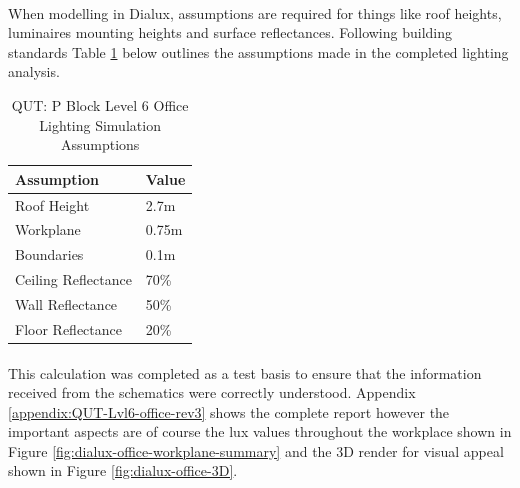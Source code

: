 \paragraph{}
When modelling in Dialux, assumptions are required for things like roof heights, luminaires mounting heights and surface reflectances. Following building standards Table \ref{table:QUT-lvl6-office-assumptions} below outlines the assumptions made in the completed lighting analysis. 

\begin{table}[htb]
	\centering
	\renewcommand{\arraystretch}{2}
	\begin{tabular}{|l|l|}
		\hline
		\textbf{Assumption} & \textbf{Value} \\ \hline
		Roof Height         & 2.7m           \\ \hline
		Workplane           & 0.75m          \\ \hline
		Boundaries          & 0.1m           \\ \hline
		Ceiling Reflectance & 70\%           \\ \hline
		Wall Reflectance    & 50\%           \\ \hline
		Floor Reflectance   & 20\%           \\ \hline
	\end{tabular}
	\caption{QUT: P Block Level 6 Office Lighting Simulation Assumptions}
	\label{table:QUT-lvl6-office-assumptions}
\end{table}  

\paragraph{}
This calculation was completed as a test basis to ensure that the information received from the schematics were correctly understood. Appendix \ref{appendix:QUT-Lvl6-office-rev3} shows the complete report however the important aspects are of course the lux values throughout the workplace shown in Figure \ref{fig:dialux-office-workplane-summary} and the 3D render for visual appeal shown in Figure \ref{fig:dialux-office-3D}.  

